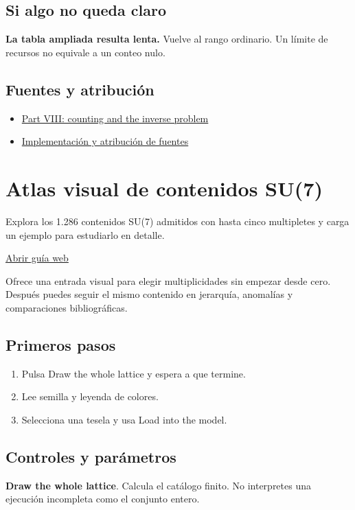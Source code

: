 \documentclass[11pt,a4paper]{article}
\begin{document}
\subsection*{Si algo no queda claro}
\textbf{La tabla ampliada resulta lenta.} Vuelve al rango ordinario. Un límite de recursos no equivale a un conteo nulo.

\subsection*{Fuentes y atribución}
\begin{itemize}
\item \href{https://karlesmarin.github.io/ghu-explorer/papers/part-viii/index.html}{Part VIII: counting and the inverse problem}
\item \href{https://github.com/karlesmarin/ghu-lab/blob/main/src/sections/census_section.js}{Implementación y atribución de fuentes}
\end{itemize}
\section{Atlas visual de contenidos SU(7)}
Explora los 1.286 contenidos SU(7) admitidos con hasta cinco multipletes y carga un ejemplo para estudiarlo en detalle.

\href{https://karlesmarin.github.io/ghu-explorer/guide/es/atlas7/index.html}{Abrir guía web}

Ofrece una entrada visual para elegir multiplicidades sin empezar desde cero. Después puedes seguir el mismo contenido en jerarquía, anomalías y comparaciones bibliográficas.
\subsection*{Primeros pasos}
\begin{enumerate}
\item Pulsa Draw the whole lattice y espera a que termine.
\item Lee semilla y leyenda de colores.
\item Selecciona una tesela y usa Load into the model.
\end{enumerate}
\subsection*{Controles y parámetros}
\textbf{Draw the whole lattice}. Calcula el catálogo finito. No interpretes una ejecución incompleta como el conjunto entero.
\end{document}
